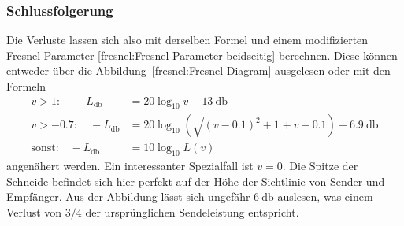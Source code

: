 \subsubsection{Schlussfolgerung}
Die Verluste lassen sich also mit derselben Formel
und einem modifizierten Fresnel-Parameter
\eqref{fresnel:Fresnel-Parameter-beidseitig}
berechnen.
Diese können entweder über die Abbildung~\ref{fresnel:Fresnel-Diagram}
ausgelesen oder mit den Formeln
    \begin{align*}
        v > 1: \quad
        -L_{\unit{\decibel}}
        &=
        20 \log_{10}v + \qty{13}{\decibel}
        \\
        v > -0.7: \quad
        -L_{\unit{\decibel}}
        &=
        20 \log_{10}\left(\sqrt{(v-0.1)^2 + 1} + v -0.1\right) + \qty{6.9}{\decibel}
        \\
        \text{sonst:} \quad
        -L_{\unit{\decibel}}
        &=
        10 \log_{10} L(v)
    \end{align*}
angenähert werden. 
Ein interessanter
Spezialfall
ist $v=0$.
Die Spitze der Schneide befindet sich hier perfekt auf der Höhe der Sichtlinie von Sender und Empfänger.
Aus der Abbildung lässt sich ungefähr $\qty{6}{\decibel}$ auslesen,
was einem Verlust von $3/4$ der ursprünglichen Sendeleistung entspricht.



